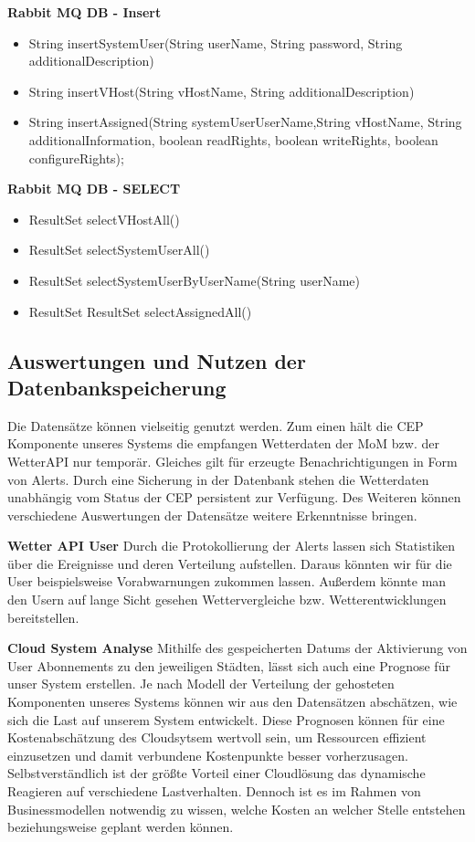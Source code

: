 {\bf Rabbit MQ DB - Insert }
\begin{itemize}
\item String insertSystemUser(String userName, String password, String additionalDescription)
\item String insertVHost(String vHostName, String additionalDescription)
\item String insertAssigned(String systemUserUserName,String vHostName, String additionalInformation, boolean readRights, boolean writeRights, boolean configureRights);
\end{itemize}

{\bf Rabbit MQ DB - SELECT }
\begin{itemize}
\item ResultSet selectVHostAll()
\item ResultSet selectSystemUserAll()
\item ResultSet selectSystemUserByUserName(String userName)
\item ResultSet ResultSet selectAssignedAll()
\end{itemize}



\subsection{Auswertungen und Nutzen der Datenbankspeicherung}
Die Datensätze können vielseitig genutzt werden. Zum einen hält die CEP Komponente unseres Systems die empfangen Wetterdaten der MoM bzw. der WetterAPI nur temporär. Gleiches gilt für erzeugte Benachrichtigungen in Form von Alerts.
Durch eine Sicherung in der Datenbank stehen die Wetterdaten unabhängig vom Status der CEP persistent zur Verfügung. 
Des Weiteren können verschiedene Auswertungen der Datensätze weitere Erkenntnisse bringen. 

\textbf{Wetter API User}
Durch die Protokollierung der Alerts lassen sich Statistiken über die Ereignisse und deren Verteilung aufstellen. Daraus könnten wir für die User beispielsweise Vorabwarnungen zukommen lassen. Außerdem könnte man den Usern auf lange Sicht gesehen Wettervergleiche bzw. Wetterentwicklungen bereitstellen.

\textbf{Cloud System Analyse}
Mithilfe des gespeicherten Datums der Aktivierung  von User Abonnements zu den jeweiligen Städten, lässt sich auch eine Prognose für unser System erstellen. Je nach Modell der Verteilung der gehosteten Komponenten unseres Systems  können wir aus den Datensätzen abschätzen, wie sich die Last auf unserem System entwickelt. 
Diese Prognosen können für eine Kostenabschätzung des Cloudsytsem wertvoll sein, um Ressourcen effizient einzusetzen und damit verbundene Kostenpunkte besser vorherzusagen.
Selbstverständlich ist der größte Vorteil einer Cloudlösung das dynamische Reagieren auf verschiedene Lastverhalten. Dennoch ist es im Rahmen von Businessmodellen notwendig zu wissen, welche Kosten an welcher Stelle entstehen beziehungsweise geplant werden können.

